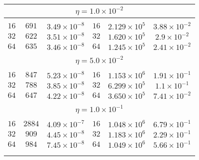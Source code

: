 \begin{table}[]
\begin{center}
\begin{tabular}{@{}ccc|ccc@{}}
\multicolumn{6}{c}{$\eta = 1.0\times 10^{-2}$} \\[5pt]
\hline\\[-11pt]
$16$ & $691$ & $3.49\times 10^{-8}$  &  $16$ & $2.129\times 10^{5}$ & $3.88\times 10^{-2}$  \\ [1pt]
$32$ & $622$ & $3.51\times 10^{-8}$  &  $32$ & $1.620\times 10^{5}$ & $2.9\times 10^{-2}$   \\ [1pt]
$64$ & $635$ & $3.46\times 10^{-8}$  &  $64$ & $1.245\times 10^{5}$ & $2.41\times 10^{-2}$  \\ [1pt]
\hline\\[-11pt]

\multicolumn{6}{c}{$\eta = 5.0\times 10^{-2}$} \\[5pt]
\hline\\[-11pt]
$16$ & $847$ & $5.23\times 10^{-8}$  &  $16$ & $1.153\times 10^{6}$ & $1.91\times 10^{-1}$ \\ [1pt]
$32$ & $788$ & $3.85\times 10^{-8}$  &  $32$ & $6.299\times 10^{5}$ & $1.1\times 10^{-1}$   \\ [1pt]
$64$ & $647$ & $4.22\times 10^{-8}$  &  $64$ & $3.650\times 10^{5}$ & $7.41\times 10^{-2}$  \\ [1pt]
\hline\\[-11pt]

\multicolumn{6}{c}{$\eta = 1.0\times 10^{-1}$} \\[5pt]
\hline\\[-11pt]
$16$ & $2884$ & $4.09\times 10^{-7}$ &  $16$ & $1.048\times 10^{6}$ & $6.79\times 10^{-1}$ \\ [1pt]
$32$ & $909$ & $4.45\times 10^{-8}$  &  $32$ & $1.183\times 10^{6}$ & $2.29\times 10^{-1}$ \\ [1pt]
$64$ & $984$ & $7.45\times 10^{-8}$  &  $64$ & $1.049\times 10^{6}$ & $5.66\times 10^{-1}$ \\ [1pt]

\hline\\[-11pt]


\hline\\[-8pt]
\end{tabular}\\[5pt]
\end{center}
\normalsize
\end{table}